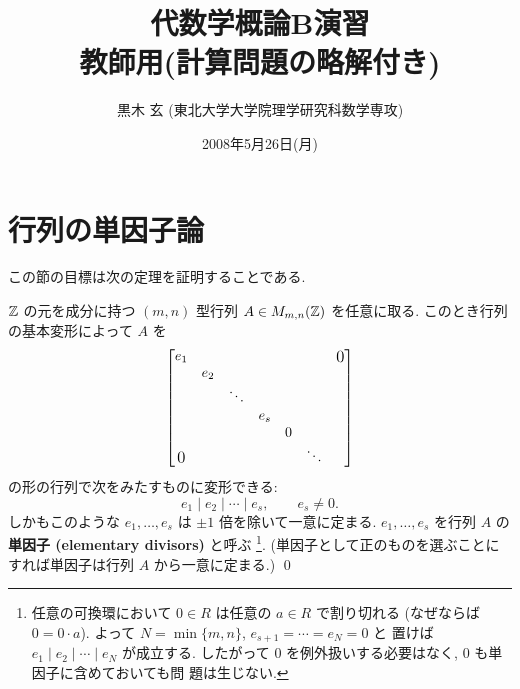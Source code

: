 \documentclass[12pt,twoside]{jarticle}
\newcommand\commentout[1]{#1}
\newcommand\commentout[1]{}
\begin{document}
\title{\bf 代数学概論B演習
  \ifx\STUDENT\undefined\\{\normalsize 教師用\quad(計算問題の略解付き)}\fi}
\author{黒木 玄 \quad (東北大学大学院理学研究科数学専攻)}
\date{2008年5月26日(月)}
\maketitle
\tableofcontents

\section{行列の単因子論}
\label{sec:elementary-divisor}

この節の目標は次の定理を証明することである.

\begin{theorem}[行列の単因子論]
\label{theorem:elementary-divisor}
  ${\mathbb Z}$ の元を成分に持つ $(m,n)$ 型行列 $A\in M_{m,n}({\mathbb Z})$ を任意に取る. 
  このとき行列の基本変形によって $A$ を
  \begin{equation*}
    \begin{bmatrix}
      e_1 &     &        &     &   & & \bigzerou \\
          & e_2 &        &     &   & & \\
          &     & \ddots &     &   & & \\
          &     &        & e_s &   & & \\
          &     &        &     & 0 & & \\
      \bigzerol & &      &     &   & \ddots & \\
    \end{bmatrix}
  \end{equation*}
  の形の行列で次をみたすものに変形できる:
  \begin{equation*}
    e_1\mid e_2\mid\cdots\mid e_s, \qquad e_s\ne 0.
  \end{equation*}
  しかもこのような $e_1,\dots,e_s$ は $\pm1$ 倍を除いて一意に定まる.  
  $e_1,\dots,e_s$ を行列 $A$ の{\bf 単因子 (elementary divisors)} と呼ぶ%
  \footnote{任意の可換環において $0\in R$ は任意の $a\in R$ で割り切れる
    (なぜならば $0=0\cdot a$).
    よって $N=\min\{m,n\}$, $e_{s+1}=\cdots=e_N=0$ と
    置けば $e_1\mid e_2\mid\cdots\mid e_N$ が成立する.
    したがって $0$ を例外扱いする必要はなく, $0$ も単因子に含めておいても問
    題は生じない.}. 
  (単因子として正のものを選ぶことにすれば単因子は行列 $A$ から一意に定まる.)
 \qed
\end{theorem}
\end{document}

